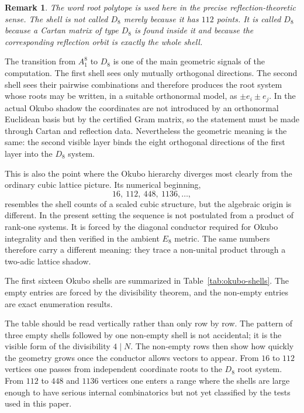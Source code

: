 \documentclass{birkjour}
\newtheorem{remark}[theorem]{Remark}
\numberwithin{equation}{section}
\begin{document}
\begin{remark}
The word root polytope is used here in the precise reflection-theoretic sense.
The shell is not called \(D_8\) merely because it has \(112\) points. It is
called \(D_8\) because a Cartan matrix of type \(D_8\) is found inside it and
because the corresponding reflection orbit is exactly the whole shell.
\end{remark}

The transition from \(A_1^8\) to \(D_8\) is one of the main geometric signals
of the computation. The first shell sees only mutually orthogonal directions.
The second shell sees their pairwise combinations and therefore produces the
root system whose roots may be written, in a suitable orthonormal model, as
\(\pm e_i\pm e_j\). In the actual Okubo shadow the coordinates are not
introduced by an orthonormal Euclidean basis but by the certified Gram matrix,
so the statement must be made through Cartan and reflection data. Nevertheless
the geometric meaning is the same: the second visible layer binds the eight
orthogonal directions of the first layer into the \(D_8\) system.

This is also the point where the Okubo hierarchy diverges most clearly from
the ordinary cubic lattice picture. Its numerical beginning,
\[
16,\ 112,\ 448,\ 1136,\ldots,
\]
resembles the shell counts of a scaled cubic structure, but the algebraic
origin is different. In the present setting the sequence is not postulated
from a product of rank-one systems. It is forced by the diagonal conductor
required for Okubo integrality and then verified in the ambient \(E_8\)
metric. The same numbers therefore carry a different meaning: they trace a
non-unital product through a two-adic lattice shadow.

The first sixteen Okubo shells are summarized in Table~\ref{tab:okubo-shells}.
The empty entries are forced by the divisibility theorem, and the non-empty
entries are exact enumeration results.

The table should be read vertically rather than only row by row. The pattern
of three empty shells followed by one non-empty shell is not accidental; it is
the visible form of the divisibility \(4\mid N\). The non-empty rows then show
how quickly the geometry grows once the conductor allows vectors to appear.
From \(16\) to \(112\) vertices one passes from independent coordinate roots
to the \(D_8\) root system. From \(112\) to \(448\) and \(1136\) vertices one
enters a range where the shells are large enough to have serious internal
combinatorics but not yet classified by the tests used in this paper.
\end{document}
